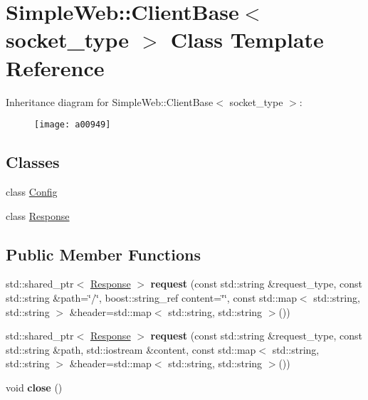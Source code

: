 \hypertarget{a00949}{}\section{Simple\+Web\+:\+:Client\+Base$<$ socket\+\_\+type $>$ Class Template Reference}
\label{a00949}
Inheritance diagram for Simple\+Web\+:\+:Client\+Base$<$ socket\+\_\+type $>$\+:\begin{figure}[H]
\begin{center}
\leavevmode
\texttt{[image: a00949]}
\end{center}
\end{figure}
\subsection*{Classes}
\begin{DoxyCompactItemize}
\item 
class \hyperlink{a00957}{Config}
\item 
class \hyperlink{a00953}{Response}
\end{DoxyCompactItemize}
\subsection*{Public Member Functions}
\begin{DoxyCompactItemize}
\item 
\mbox{\label{a00949_ac8a838ace77f0a1a19b8cb03bdba7e74}} 
std\+::shared\+\_\+ptr$<$ \hyperlink{a00953}{Response} $>$ {\bfseries request} (const std\+::string \&request\+\_\+type, const std\+::string \&path=\char`\"{}/\char`\"{}, boost\+::string\+\_\+ref content=\char`\"{}\char`\"{}, const std\+::map$<$ std\+::string, std\+::string $>$ \&header=std\+::map$<$ std\+::string, std\+::string $>$())
\item 
\mbox{\label{a00949_aca6cb17dbea9adf0cf1daf9d1ea70f76}} 
std\+::shared\+\_\+ptr$<$ \hyperlink{a00953}{Response} $>$ {\bfseries request} (const std\+::string \&request\+\_\+type, const std\+::string \&path, std\+::iostream \&content, const std\+::map$<$ std\+::string, std\+::string $>$ \&header=std\+::map$<$ std\+::string, std\+::string $>$())
\item 
\mbox{\label{a00949_ad21735a9bda2fae6aedd811efae981e1}} 
void {\bfseries close} ()
\end{DoxyCompactItemize}
